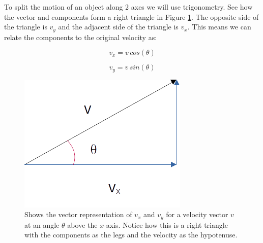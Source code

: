 \documentclass[12pt]{book}
\begin{document}
To split the motion of an object along 2 axes we will use trigonometry. See how the vector and components form a right triangle in Figure \ref{velangle}. The opposite side of the triangle is $v_y$ and the adjacent side of the triangle is $v_x$. This means we can relate the components to the original velocity as:

\begin{equation}
v_x = v \, cos(\theta)
\end{equation}

\begin{equation}
v_y = v \, sin(\theta)
\end{equation}

\begin{figure}[t]
\centering
\includegraphics[scale=0.4]{Velocity_Angle.png}
\caption{Shows the vector representation of $v_x$ and $v_y$ for a velocity vector $v$ at an angle $\theta$ above the $x$-axis. Notice how this is a right triangle with the components as the legs and the velocity as the hypotenuse.}
\label{velangle}
\end{figure}
\end{document}

